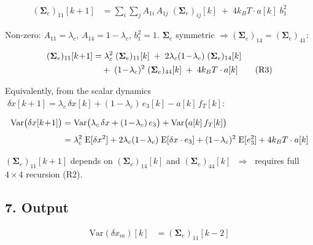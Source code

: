 \documentclass[11pt]{article}
\newcommand{\Se}{\bm{\Sigma}_e}
\begin{document}
\begin{align}
(\Se)_{11}[k\!+\!1]
&= \sum_{i}\sum_{j} A_{1i}\,A_{1j}\;(\Se)_{ij}[k]
\;+\; 4k_BT\cdot a[k]\;b_1^2
\end{align}

\noindent Non-zero: $A_{11}=\lambda_c$,\; $A_{14}=1\!-\!\lambda_c$,\;
$b_1^2=1$.\; $\Se$ symmetric $\Rightarrow (\Se)_{14}=(\Se)_{41}$:

\begin{align}
(\Se)_{11}[k\!+\!1]
&= \lambda_c^2\;(\Se)_{11}[k]
\;+\; 2\lambda_c(1\!-\!\lambda_c)\;(\Se)_{14}[k] \notag\\
&\quad+\; (1\!-\!\lambda_c)^2\;(\Se)_{44}[k]
\;+\; 4k_BT\cdot a[k]
\tag{R3}
\end{align}

\noindent Equivalently, from the scalar dynamics
$\;\delta x[k\!+\!1]=\lambda_c\,\delta x[k]+(1\!-\!\lambda_c)\,e_3[k]-a[k]\,f_T[k]$:

\begin{align}
\mathrm{Var}\bigl(\delta x[k\!+\!1]\bigr)
&= \mathrm{Var}\bigl(\lambda_c\,\delta x + (1\!-\!\lambda_c)\,e_3\bigr)
 + \mathrm{Var}\bigl(a[k]\,f_T[k]\bigr) \notag\\[4pt]
&= \lambda_c^2\;\mathrm{E}[\delta x^2]
 + 2\lambda_c(1\!-\!\lambda_c)\;\mathrm{E}[\delta x\cdot e_3]
 + (1\!-\!\lambda_c)^2\;\mathrm{E}[e_3^2]
 + 4k_BT\cdot a[k]
\end{align}

\noindent $(\Se)_{11}[k\!+\!1]$ depends on $(\Se)_{14}[k]$ and $(\Se)_{44}[k]$
$\;\Rightarrow\;$ requires full $4\!\times\!4$ recursion (R2).

\subsection*{7. Output}

\begin{align}
\mathrm{Var}(\delta x_m)[k] &= (\Se)_{11}[k\!-\!2]
\end{align}
\end{document}

